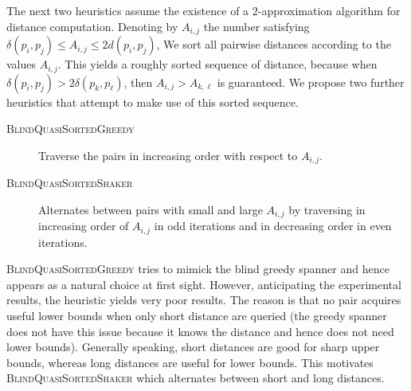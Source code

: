 \documentclass[a4paper,USenglish]{socg-lipics-v2018}
\newcommand{\dist}{\delta}
\def\marrow{\marginpar[\hfill$\longrightarrow$]{$\longleftarrow$}}
\def\michael#1{\textcolor{red}{\textsc{Michael says: }{\marrow\sf #1}}}
\begin{document}

The next two heuristics assume the existence of a $2$-approximation algorithm for distance
computation. Denoting by $A_{i,j}$ the number satisfying $\dist(p_i,p_j)\leq A_{i,j}\leq 2 d(p_i,p_j)$,
We sort all pairwise distances according to the values $A_{i,j}$.
This yields a roughly sorted sequence of distance, because when $\dist(p_i,p_j)>2\dist(p_k,p_\ell)$,
then $A_{i,j}>A_{k,\ell}$ is guaranteed.
We propose two further heuristics that attempt to make use of this sorted sequence.
\begin{description}
\item [\textsc{BlindQuasiSortedGreedy}] Traverse the pairs in increasing order with respect to $A_{i,j}$.
\item [\textsc{BlindQuasiSortedShaker}] Alternates between pairs with small and large $A_{i,j}$
by traversing in increasing order of $A_{i,j}$ in odd iterations and in decreasing order
in even iterations.
\end{description}

\textsc{BlindQuasiSortedGreedy} tries to mimick the blind greedy spanner and hence appears as a natural
choice at first sight. However, anticipating the experimental results, the heuristic yields very poor
results. The reason is that no pair acquires useful lower bounds when only short distance are queried
(the greedy spanner does not have this issue because it knows the distance and hence does not need
lower bounds).
Generally speaking, short distances are good for sharp upper bounds, whereas long distances are
useful for lower bounds. This motivates \textsc{BlindQuasiSortedShaker}
which alternates between short and long distances.
\end{document}
